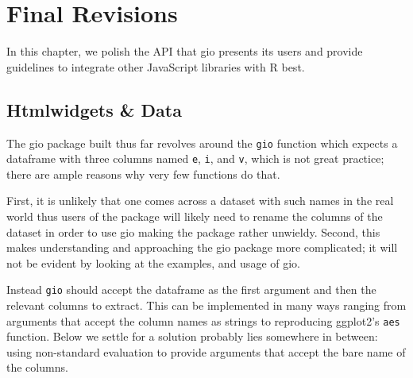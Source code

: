\documentclass[
  10pt,
]{krantz}
\begin{document}
\hypertarget{widgets-final}{%
\chapter{Final Revisions}\label{widgets-final}}

In this chapter, we polish the API that gio presents its users and provide guidelines to integrate other JavaScript libraries with R best.

\hypertarget{widgets-final-data}{%
\section{Htmlwidgets \& Data}\label{widgets-final-data}}

The gio package built thus far revolves around the \texttt{gio} function which expects a dataframe with three columns named \texttt{e}, \texttt{i}, and \texttt{v}, which is not great practice; there are ample reasons why very few functions do that.

First, it is unlikely that one comes across a dataset with such names in the real world thus users of the package will likely need to rename the columns of the dataset in order to use gio making the package rather unwieldy. Second, this makes understanding and approaching the gio package more complicated; it will not be evident by looking at the examples, and usage of gio.

Instead \texttt{gio} should accept the dataframe as the first argument and then the relevant columns to extract. This can be implemented in many ways ranging from arguments that accept the column names as strings to reproducing ggplot2's \texttt{aes} function. Below we settle for a solution probably lies somewhere in between: using non-standard evaluation to provide arguments that accept the bare name of the columns.
\end{document}
